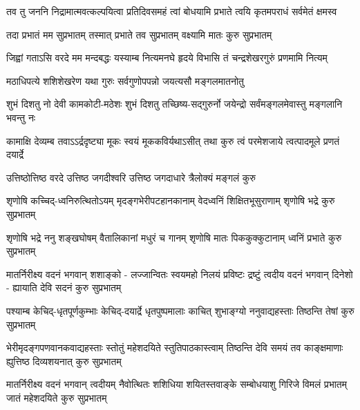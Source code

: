 

{तव तु जननि निद्रामात्मवत्कल्पयित्वा}
{प्रतिदिवसमहं त्वां बोधयामि प्रभाते}
{त्वयि कृतमपराधं सर्वमेतं क्षमस्व}

{तदा प्रभातं मम सुप्रभातम्}
{तस्मात् प्रभाते तव सुप्रभातम्}
{वक्ष्यामि मातः कुरु सुप्रभातम्}

{जिह्वां गताऽसि वरदे मम मन्दबद्धः}
{यस्याम्ब नित्यमनघे हृदये विभासि}
{तं चन्द्रशेखरगुरुं प्रणमामि नित्यम्}

{मठाधिपत्ये शशिशेखरेण}
{यथा गुरुः सर्वगुणोपपन्नो}
{जयत्यसौ मङ्गलमातनोतु}

{शुभं दिशतु नो देवी कामकोटी-मठेशः}
{शुभं दिशतु तच्छिष्य-सद्गुरुर्नो जयेन्द्रो}
{सर्वंमङ्गलमेवास्तु मङ्गलानि भवन्तु नः}

\fourlineindentedshloka
{कामाक्षि देव्यम्ब तवाऽऽर्द्रदृष्ट्या}
{मूकः स्वयं मूककविर्यथाऽसीत्}
{तथा कुरु त्वं परमेशजाये}
{त्वत्पादमूले प्रणतं दयार्द्रे}

\twolineshloka
{उत्तिष्ठोत्तिष्ठ वरदे उत्तिष्ठ जगदीश्वरि}
{उत्तिष्ठ जगदाधारे त्रैलोक्यं मङ्गलं कुरु}

\fourlineindentedshloka
{शृणोषि कच्चिद्-ध्वनिरुत्थितोऽयम्}
{मृदङ्गभेरीपटहानकानाम्}
{वेदध्वनिं शिक्षितभूसुराणाम्}
{शृणोषि भद्रे कुरु सुप्रभातम्}

\fourlineindentedshloka
{शृणोषि भद्रे ननु शङ्खघोषम्}
{वैतालिकानां मधुरं च गानम्}
{शृणोषि मातः पिककुक्कुटानाम्}
{ध्वनिं प्रभाते कुरु सुप्रभातम्}

\fourlineindentedshloka
{मातर्निरीक्ष्य वदनं भगवान् शशाङ्को -}
{लज्जान्वितः स्वयमहो निलयं प्रविष्टः}
{द्रष्टुं त्वदीय वदनं भगवान् दिनेशो -}
{ह्यायाति देवि सदनं कुरु सुप्रभातम्}

\fourlineindentedshloka
{पश्याम्ब केचिद्-धृतपूर्णकुम्भाः}
{केचिद्-दयार्द्रे धृतपुष्पमालाः}
{काचित् शुभाङ्ग्यो ननुवाद्यहस्ताः}
{तिष्ठन्ति तेषां कुरु सुप्रभातम्}

\fourlineindentedshloka
{भेरीमृदङ्गपणवानकवाद्यहस्ताः}
{स्तोतुं महेशदयिते स्तुतिपाठकास्त्वाम्}
{तिष्ठन्ति देवि समयं तव काङ्क्षमाणाः}
{ह्युत्तिष्ठ दिव्यशयनात् कुरु सुप्रभातम्}

\fourlineindentedshloka
{मातर्निरीक्ष्य वदनं भगवान् त्वदीयम्}
{नैवोत्थितः शशिधिया शयितस्तवाङ्के}
{सम्बोधयाशु गिरिजे विमलं प्रभातम्}
{जातं महेशदयिते कुरु सुप्रभातम्}

